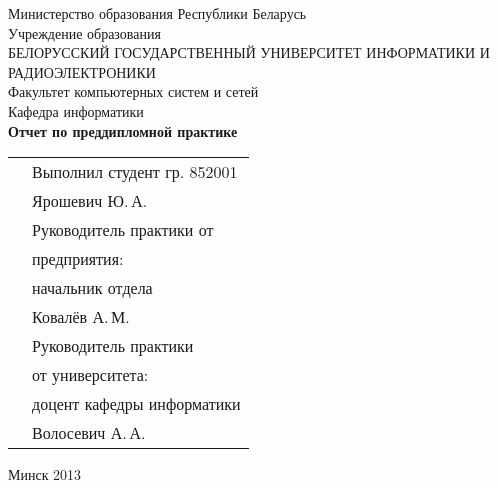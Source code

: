 \begin{titlepage}
    
    \begin{center}
        Министерство образования Республики Беларусь \\[0.4cm] 

        Учреждение образования \\

        \MakeUppercase{БЕЛОРУССКИЙ ГОСУДАРСТВЕННЫЙ УНИВЕРСИТЕТ ИНФОРМАТИКИ И РАДИОЭЛЕКТРОНИКИ} \\[0.4cm]

        Факультет компьютерных систем и сетей \\[0.4cm]

        Кафедра информатики \\[3.4cm] %

        {\large\bfseries{Отчет по преддипломной практике}} \\[2cm]

        \noindent
        \begin{tabular}{p{}p{}}
            & Выполнил студент гр. 852001 \\
            & Ярошевич Ю.\,А. \\[1cm]

            & Руководитель практики от \\
            & предприятия: \\
            & начальник отдела \\
            & Ковалёв А.\,М. \\[1cm]

            & Руководитель практики \\
            & от университета: \\
            & доцент кафедры информатики \\
            & Волосевич А.\,А. \\
        \end{tabular}

        \vfill

        {\normalsize Минск 2013}
    \end{center}

\end{titlepage}
